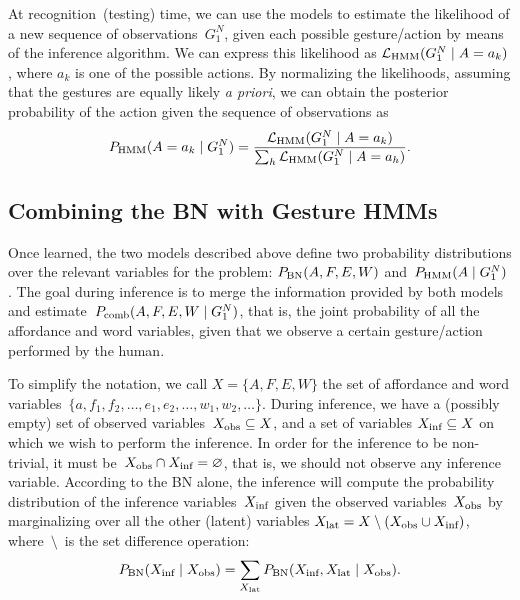 At recognition~(testing) time, we can use the models to estimate the likelihood of a new sequence of observations~$G_1^N$, given each possible gesture/action by means of the \FB{} inference algorithm.
We can express this likelihood as $\mathcal{L}_\text{HMM}(G_1^N \mid A=a_k)$, where $a_k$ is one of the possible actions.
By normalizing the likelihoods, assuming that the gestures are equally likely \emph{a priori}, we can obtain the posterior probability of the action given the sequence of observations as
\begin{equation*}
  P_{\text{HMM}}(A=a_k \mid G_1^N) = \frac{\mathcal{L}_\text{HMM}(G_1^N \mid A=a_k)}{\sum_h \mathcal{L}_\text{HMM}(G_1^N \mid A=a_h)}.
\end{equation*}

\subsection{Combining the \acs{BN} with Gesture \acsp{HMM}}
\label{sec:combination}
Once learned, the two models described above define two probability distributions over the relevant variables for the problem:
$P_{\text{BN}}(A, F, E, W)$ and~$P_{\text{HMM}}(A \mid G_1^N)$.
The goal during inference is to merge the information provided by both models and estimate~$P_\text{comb}(A, F, E, W \mid G_1^N)$, that is, the joint probability of all the affordance and word variables, given that we observe a certain gesture/action performed by the human.

To simplify the notation, we call $X = \{A, F, E, W\}$ the set of affordance and word variables~$\{a, f_1, f_2, \dots, e_1, e_2, \dots, w_1, w_2, \dots\}$.
During inference, we have a (possibly empty) set of observed variables~$X_\text{obs} \subseteq X$, and a set of variables $X_\text{inf} \subseteq X$ on which we wish to perform the inference.
In order for the inference to be non-trivial, it must be~$X_\text{obs} \cap X_\text{inf} = \varnothing$, that is, we should not observe any inference variable.
According to the \ac{BN} alone, the inference will compute the probability distribution of the inference variables~$X_\text{inf}$ given the observed variables~$X_\text{obs}$ by marginalizing over all the other (latent) variables $X_\text{lat} = X \setminus (X_\text{obs} \cup X_\text{inf})$, where~$\setminus$~is the set difference operation:
\begin{equation*}
 P_{\text{BN}}(X_\text{inf} \mid X_\text{obs}) = \sum_{X_\text{lat}} P_{\text{BN}}(X_\text{inf}, X_\text{lat} \mid X_\text{obs}).
\end{equation*}

